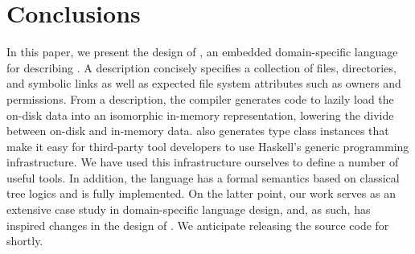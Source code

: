 \section{Conclusions}
\label{sec:conclusion}
In this paper, we present the design of \forest{}, an embedded
domain-specific language for describing \filestores{}.  A \forest{}
description concisely specifies a collection of files, directories,
and symbolic links as well as expected file system attributes such as
owners and permissions.  From a description, the \forest{} compiler
generates code to lazily load the on-disk data into an isomorphic
in-memory representation, lowering the divide between on-disk and
in-memory data.  
\forest{} also generates type class instances that make it 
easy for third-party tool developers to use
Haskell's generic programming infrastructure.  We have used this
infrastructure ourselves to define a number of useful tools. 
In addition, the language has a formal semantics based on classical tree logics and is
fully implemented.  On the latter point, our work 
serves as an extensive case study in domain-specific
language design, and, as such, has inspired changes in the design of
\template{}.  We anticipate releasing the 
source code for \forest{} shortly.

